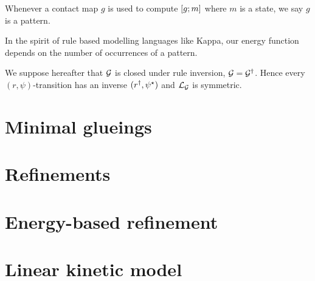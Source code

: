 

Whenever a contact map $g$ is used to compute $\left[g;m\right]$
where $m$ is a state, we say $g$ is a pattern.

In the spirit of rule based modelling languages like Kappa,
our energy function depends on the number of occurrences of a pattern.


We suppose hereafter that $\mathcal{G}$ is closed under
rule inversion, \ie $\mathcal{G} = \mathcal{G}^\dagger$.
Hence every $(r,\psi)$-transition
has an inverse $(r^\dagger,\psi^\star)$
and $\mathcal{L}_{\mathcal{G}}$ is symmetric.


\section{Minimal glueings}
\label{sec:mg}

\section{Refinements} %
\label{sec:gp}
\fi

\section{Energy-based refinement}
\label{sec:energy-gp}

\section{Linear kinetic model}
\label{sec:kinetic-model}





